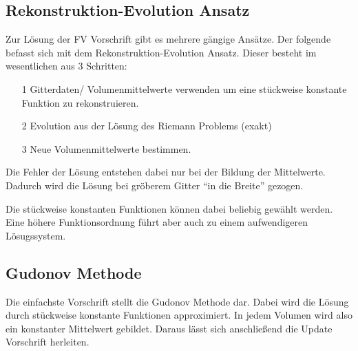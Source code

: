\subsection{Rekonstruktion-Evolution Ansatz}
Zur L\"osung der FV Vorschrift gibt es mehrere g\"angige Ans\"atze. Der folgende befasst sich mit dem Rekonstruktion-Evolution Ansatz. Dieser besteht im wesentlichen aus 3 Schritten:
\par
\begin{itemize}
	\item[1] Gitterdaten/ Volumenmittelwerte verwenden um eine st\"uckweise konstante Funktion zu rekonstruieren.
	\item[2] Evolution aus der L\"osung des Riemann Problems (exakt)
	\item[3] Neue Volumenmittelwerte bestimmen.
\end{itemize}
Die Fehler der L\"osung entstehen dabei nur bei der Bildung der Mittelwerte. Dadurch wird die L\"osung bei gr\"oberem Gitter ``in die Breite'' gezogen.
\par
Die st\"uckweise konstanten Funktionen k\"onnen dabei beliebig gew\"ahlt werden. Eine h\"ohere Funktionsordnung f\"uhrt aber auch zu einem aufwendigeren L\"osugssystem.

\subsection{Gudonov Methode}
Die einfachste Vorschrift stellt die Gudonov Methode dar. Dabei wird die L\"osung durch st\"uckweise konstante Funktionen approximiert. In jedem Volumen wird also ein konstanter Mittelwert gebildet. Daraus l\"asst sich anschlie\ss{}end die Update Vorschrift herleiten.

\newpage


